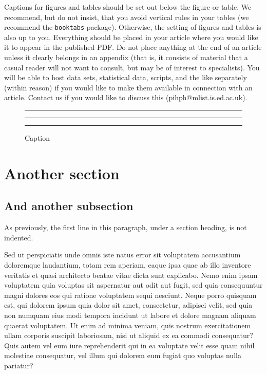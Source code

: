 \documentclass[article, a4paper, 12pt]{memoir}
\begin{document}
Captions for figures and tables should be set out below the figure or table. We recommend, but do not insist, that you avoid vertical rules in your tables (we recommend the \texttt{booktabs} package). Otherwise, the setting of figures and tables is also up to you. Everything should be placed in your article where you would like it to appear in the published PDF. Do not place anything at the end of an article unless it clearly belongs in an appendix (that is, it consists of material that a casual reader will not want to consult, but may be of interest to specialists). You will be able to host data sets, statistical data, scripts, and the like separately (within reason) if you would like to make them available in connection with an article. Contact us if you would like to discuss this (pihph@\hspace{0pt}mlist.is.ed.ac.uk).

\begin{figure}[h]
  \centering
  \rule{.1pt}{2cm} \rule{2cm}{.1pt} \rule{.1pt}{2cm}
  \caption{Caption}
  \label{fig:example}
\end{figure}

\section{Another section}
\label{sec:another-section}

\subsection{And another subsection}
\label{sec:another-subsection}

As previously, the first line in this paragraph, under a section heading, is not indented. 

Sed ut perspiciatis unde omnis iste natus error sit voluptatem accusantium doloremque laudantium, totam rem aperiam, eaque ipsa quae ab illo inventore veritatis et quasi architecto beatae vitae dicta sunt explicabo. Nemo enim ipsam voluptatem quia voluptas sit aspernatur aut odit aut fugit, sed quia consequuntur magni dolores eos qui ratione voluptatem sequi nesciunt. Neque porro quisquam est, qui dolorem ipsum quia dolor sit amet, consectetur, adipisci velit, sed quia non numquam eius modi tempora incidunt ut labore et dolore magnam aliquam quaerat voluptatem. Ut enim ad minima veniam, quis nostrum exercitationem ullam corporis suscipit laboriosam, nisi ut aliquid ex ea commodi consequatur? Quis autem vel eum iure reprehenderit qui in ea voluptate velit esse quam nihil molestiae consequatur, vel illum qui dolorem eum fugiat quo voluptas nulla pariatur?
\end{document}
